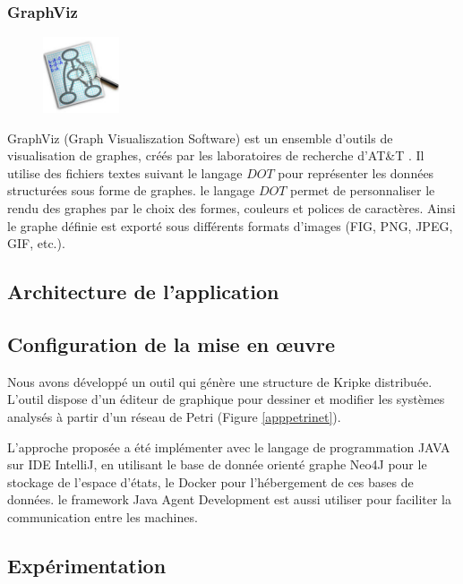 \subsubsection*{GraphViz}
\begin{figure}
	\vspace{-50pt}
	\begin{center}
		\includegraphics[width=0.2\textwidth]{img/graphviz}
	\end{center}  
\vspace{-20pt}
\vspace{-10pt}  
\end{figure}
GraphViz (Graph Visualiszation Software) est un ensemble d'outils de visualisation de graphes, créés par les laboratoires de recherche d'AT\&T \citep{graphviz}. Il utilise des fichiers textes suivant le langage $DOT$ pour représenter les données structurées sous forme de graphes. le langage $DOT$ permet  de personnaliser le rendu des graphes par le choix des formes, couleurs et polices de caractères. Ainsi le graphe définie est exporté sous différents formats d'images (FIG, PNG, JPEG, GIF, etc.).




\subsection{Architecture de l'application}

\subsection{Configuration de la mise en œuvre}
Nous avons développé un outil qui génère une structure de Kripke distribuée. L’outil dispose d’un éditeur de graphique pour dessiner et modifier les systèmes analysés à partir d'un réseau de Petri (Figure \ref{apppetrinet}).

L’approche proposée a été implémenter avec le langage de programmation JAVA sur IDE IntelliJ, en utilisant le base de donnée orienté graphe Neo4J pour le stockage de l'espace d'états, le Docker pour l'hébergement de ces bases de données. le framework Java Agent Development est aussi utiliser pour faciliter la communication entre les machines.

\subsection{Expérimentation}